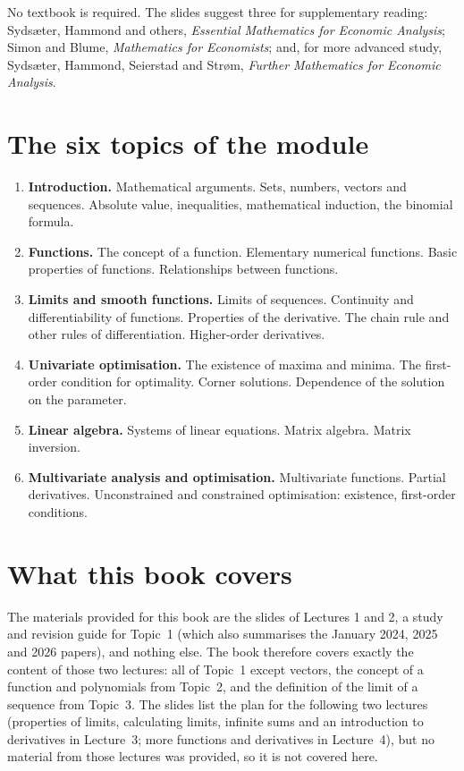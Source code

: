 No textbook is required. The slides suggest three for supplementary reading: Sydsæter, Hammond and others,
\emph{Essential Mathematics for Economic Analysis}; Simon and Blume, \emph{Mathematics for Economists}; and,
for more advanced study, Sydsæter, Hammond, Seierstad and Strøm, \emph{Further Mathematics for Economic
Analysis}.

\section*{The six topics of the module}
\begin{enumerate}[label=\textbf{Topic \arabic*.}, leftmargin=5.5em]
  \item \textbf{Introduction.} Mathematical arguments. Sets, numbers, vectors and sequences. Absolute value,
  inequalities, mathematical induction, the binomial formula.
  \item \textbf{Functions.} The concept of a function. Elementary numerical functions. Basic properties of
  functions. Relationships between functions.
  \item \textbf{Limits and smooth functions.} Limits of sequences. Continuity and differentiability of
  functions. Properties of the derivative. The chain rule and other rules of differentiation. Higher-order
  derivatives.
  \item \textbf{Univariate optimisation.} The existence of maxima and minima. The first-order condition for
  optimality. Corner solutions. Dependence of the solution on the parameter.
  \item \textbf{Linear algebra.} Systems of linear equations. Matrix algebra. Matrix inversion.
  \item \textbf{Multivariate analysis and optimisation.} Multivariate functions. Partial derivatives.
  Unconstrained and constrained optimisation: existence, first-order conditions.
\end{enumerate}

\section*{What this book covers}
The materials provided for this book are the slides of Lectures 1 and 2, a study and revision guide for
Topic~1 (which also summarises the January 2024, 2025 and 2026 papers), and nothing else. The book therefore
covers exactly the content of those two lectures: all of Topic~1 except vectors, the concept of a function
and polynomials from Topic~2, and the definition of the limit of a sequence from Topic~3. The slides list
the plan for the following two lectures (properties of limits, calculating limits, infinite sums and an
introduction to derivatives in Lecture~3; more functions and derivatives in Lecture~4), but no material
from those lectures was provided, so it is not covered here.

